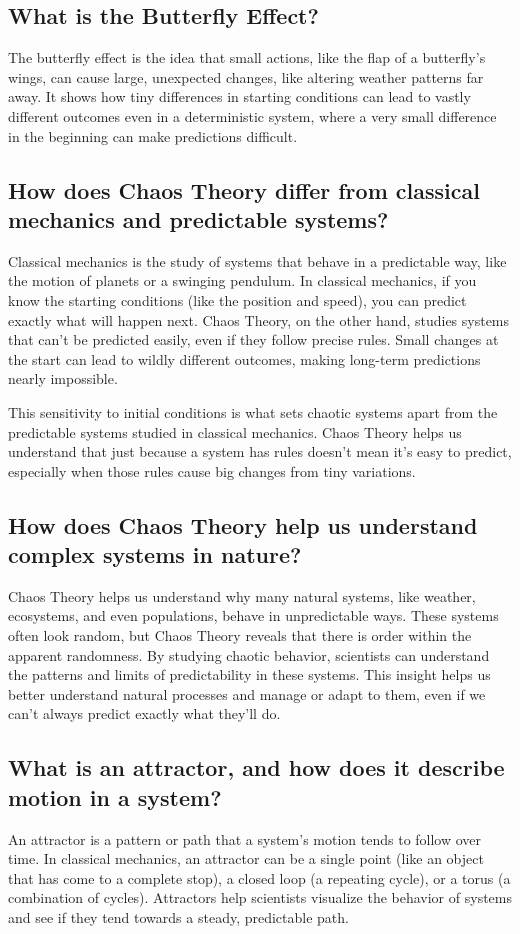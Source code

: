 \documentclass[12pt]{article}
\begin{document}
\subsection{What is the Butterfly Effect?}
The butterfly effect is the idea that small actions, like the flap of a butterfly’s wings, can cause large, unexpected changes, like altering weather patterns far away. It shows how tiny differences in starting conditions can lead to vastly different outcomes even in a deterministic system, where a very small difference in the beginning can make predictions difficult.

\subsection{How does Chaos Theory differ from classical mechanics and predictable systems?}
Classical mechanics is the study of systems that behave in a predictable way, like the motion of planets or a swinging pendulum. In classical mechanics, if you know the starting conditions (like the position and speed), you can predict exactly what will happen next. Chaos Theory, on the other hand, studies systems that can’t be predicted easily, even if they follow precise rules. Small changes at the start can lead to wildly different outcomes, making long-term predictions nearly impossible.

This sensitivity to initial conditions is what sets chaotic systems apart from the predictable systems studied in classical mechanics. Chaos Theory helps us understand that just because a system has rules doesn’t mean it’s easy to predict, especially when those rules cause big changes from tiny variations.

\subsection{How does Chaos Theory help us understand complex systems in nature?}
Chaos Theory helps us understand why many natural systems, like weather, ecosystems, and even populations, behave in unpredictable ways. These systems often look random, but Chaos Theory reveals that there is order within the apparent randomness. By studying chaotic behavior, scientists can understand the patterns and limits of predictability in these systems. This insight helps us better understand natural processes and manage or adapt to them, even if we can’t always predict exactly what they’ll do.

\subsection{What is an attractor, and how does it describe motion in a system?}
An attractor is a pattern or path that a system’s motion tends to follow over time. In classical mechanics, an attractor can be a single point (like an object that has come to a complete stop), a closed loop (a repeating cycle), or a torus (a combination of cycles). Attractors help scientists visualize the behavior of systems and see if they tend towards a steady, predictable path.
\end{document}
